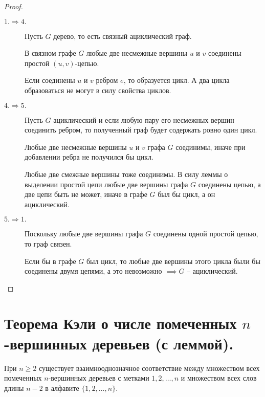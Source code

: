 \begin{proof}\leavevmode
    \begin{description}
        \item[$ \boxed{1. \Rightarrow 4.} $] Пусть $ G $ дерево, то есть связный ациклический граф.

              В связном графе $ G $ любые две несмежные вершины $ u $ и $ v $ соединены простой $ (u,v) $-цепью.

              Если соединены $ u $ и $ v $ ребром $ e $, то образуется цикл. А два цикла образоваться не могут в силу свойства циклов.

        \item[$ \boxed{4. \Rightarrow 5.} $] Пусть $ G $ ациклический и если любую пару его несмежных вершин соединить ребром, то полученный граф будет содержать ровно один цикл.

              Любые две несмежные вершины $ u $ и $ v $ графа $ G $ соединимы, иначе при добавлении ребра не получился бы цикл.

              Любые две смежные вершины тоже соединимы. В силу леммы о выделении простой цепи любые две вершины графа $ G $ соединены цепью, а две цепи быть не может, иначе в графе $ G $ был бы цикл, а он ациклический.

        \item[$ \boxed{5. \Rightarrow 1.} $] Поскольку любые две вершины графа $ G $ соединены одной простой цепью, то граф связен.

              Если бы в графе $ G $ был цикл, то любые две вершины этого цикла были бы соединены двумя цепями, а это невозможно $ \implies G $ -- ациклический.
    \end{description}
\end{proof}

\section{Теорема Кэли о числе помеченных $n$-вершинных деревьев (с леммой).}

\begin{lemma}\label{lemma:1}
    При $ n \geqslant 2 $ существует взаимнооднозначное соответствие между множеством всех помеченных $ n $-вершинных деревьев с метками $ 1,2,\ldots,n $ и множеством всех слов длины $ n-2 $ в алфавите $ \{1,2,\ldots,n\} $.
\end{lemma}

